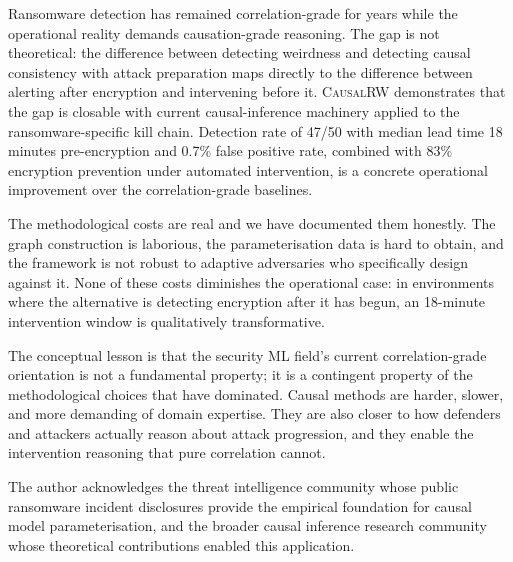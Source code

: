 \documentclass[sigconf,nonacm]{acmart}
\begin{document}
Ransomware detection has remained correlation-grade for years while
the operational reality demands causation-grade reasoning. The gap is
not theoretical: the difference between detecting weirdness and
detecting causal consistency with attack preparation maps directly to
the difference between alerting after encryption and intervening
before it. \textsc{CausalRW} demonstrates that the gap is closable
with current causal-inference machinery applied to the
ransomware-specific kill chain. Detection rate of 47/50 with
median lead time 18 minutes pre-encryption and 0.7\% false positive
rate, combined with 83\% encryption prevention under automated
intervention, is a concrete operational improvement over the
correlation-grade baselines.

The methodological costs are real and we have documented them
honestly. The graph construction is laborious, the parameterisation
data is hard to obtain, and the framework is not robust to adaptive
adversaries who specifically design against it. None of these costs
diminishes the operational case: in environments where the
alternative is detecting encryption after it has begun, an 18-minute
intervention window is qualitatively transformative.

The conceptual lesson is that the security ML field's current
correlation-grade orientation is not a fundamental property; it is a
contingent property of the methodological choices that have dominated.
Causal methods are harder, slower, and more demanding of domain
expertise. They are also closer to how defenders and attackers
actually reason about attack progression, and they enable the
intervention reasoning that pure correlation cannot.

\begin{acks}
The author acknowledges the threat intelligence community whose
public ransomware incident disclosures provide the empirical
foundation for causal model parameterisation, and the broader causal
inference research community whose theoretical contributions enabled
this application.
\end{acks}
\end{document}
